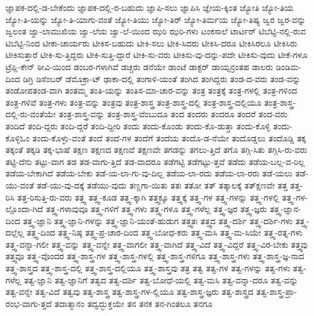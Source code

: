 {ಜ್ಞಾಪಕ-ದಲ್ಲಿ-ಡ-ಬೇಕೆಂದು
ಜ್ಞಾಪಕ-ದಲ್ಲಿ-ರ-ಬಹುದು
ಜ್ಞಾಪಿ-ಸಲು
ಜ್ಞಾಪಿಸಿ
ಜ್ಞೇಯ-ಕ್ಕಿಂತ
ಜ್ಯೋತಿ
ಜ್ಯೋ-ತಿಯ
ಜ್ಯೋ-ತಿ-ಯನ್ನು
ಜ್ಯೋ-ತಿ-ಯಾಗು-ವಂತೆ
ಜ್ಯೋ-ತಿಯು
ಜ್ಯೋ-ತಿರ್
ಜ್ಯೋ-ತಿರ್ಮಯ
ಜ್ಯೋ-ತಿಷ್ಯ
ಜ್ವರ
ಜ್ವರ-ವನ್ನು
ಜ್ವಲಂತ
ಜ್ವಾ-ಲಾಮುಖಿಯ
ಜ್ವಾ-ಲೆಯ
ಜ್ವಾ-ಲೆ-ಯಿಂದ
ಝರಿ
ಝರಿ-ಗಳು
ಟಂಕಸಾಲೆ
ಟಾರ್ಟರ್
ಟಿಬೆಟ್ಟಿ-ನಲ್ಲಿ-ರುವ
ಟಿಬೆಟ್ಟಿ-ನಿಂದ
ಟೀಕಾ-ಚಾರ್ಯರು
ಟೀಕಿಸ-ಬಹುದು
ಟೀಕಿ-ಸಲು
ಟೀಕಿ-ಸಿದರು
ಟೀಕಿಸಿ-ದರೂ
ಟೀಕಿಸಿರಲೂ
ಟೀಕಿಸಿರು
ಟೀಕಿಸುತ್ತಾರೆ
ಟೀಕಿ-ಸು-ತ್ತಿದ್ದರು
ಟೀಕಿ-ಸುತ್ತಿ-ದ್ದಾರೆ
ಟೀಕಿ-ಸು-ವರು
ಟೀಕಿಸು-ವು-ದನ್ನು-ಪದೇ
ಟೀಕಿಸು-ವುದು
ಟೀಕೆ-ಗಳೂ
ಟ್ರೆಪ್ಲಿ-ಕೇನ್
ಠೀವಿ-ಯಿಂದ
ಡಂಬರ-ಗಳಾಗಿವೆ
ಡಚ್ಚರು
ಡನೆಯೇ
ಡಾಂಟೆ
ಡಾಕ್ಟರ್
ಡಾಯ್ಸನ್ರಂತಹ
ಡಾಲರು
ಡಿಂಡಿಮ-ದಿಂದ
ಡಿಗ್ರಿ
ಡಿಸೆಂಬರ್
ಡೆಮೊಕ್ರಾ-ಟ್
ಢಾಕಾ-ದಲ್ಲಿ
ತಂಗಾಳಿ-ಯಂತೆ
ತಂಗಿದ
ತಂಗಿದ್ದರು
ತಂಡ-ದ-ವರು
ತಂಡ-ವನ್ನು
ತಂಡೋಪತಂಡ-ವಾಗಿ
ತಂತಮ್ಮ
ತಂತಿ-ಯನ್ನು
ತಂತಿಸ-ಮಾ-ಚಾರ-ವನ್ನು
ತಂತ್ರ
ತಂತ್ರಕ್ಕೆ
ತಂತ್ರ-ಗಳಲ್ಲಿ
ತಂತ್ರ-ಗಳಿಂದ
ತಂತ್ರ-ಗಳಿವೆ
ತಂತ್ರ-ಗಳು
ತಂತ್ರ-ವನ್ನು
ತಂತ್ರವು
ತಂತ್ರ-ಶಾಸ್ತ್ರ
ತಂತ್ರ-ಶಾಸ್ತ್ರ-ದಲ್ಲಿ
ತಂತ್ರ-ಶಾಸ್ತ್ರ-ದಲ್ಲಿಯೂ
ತಂತ್ರ-ಶಾಸ್ತ್ರ-ದಲ್ಲಿ-ರು-ವಂತೆಯೇ
ತಂತ್ರ-ಶಾಸ್ತ್ರ-ವನ್ನು
ತಂತ್ರ-ಶಾಸ್ತ್ರ-ವೆಂಬುದೂ
ತಂದ
ತಂದರು
ತಂದರೂ
ತಂದರೆ
ತಂದ-ವರು
ತಂದಿದೆ
ತಂದಿ-ದ್ದರು
ತಂದಿ-ದ್ದರೆ
ತಂದಿ-ದ್ದೀರಿ
ತಂದು
ತಂದು-ಕೊಂಡು
ತಂದು-ಕೊ-ಡುತ್ತಾ
ತಂದು-ಕೊಳ್ಳಿ
ತಂದು-ಕೊಳ್ಳಿಓಂ
ತಂದು-ಕೊಳ್ಳು-ವಂತೆ
ತಂದೆ
ತಂದೆ-ಗಳ
ತಂದೆಗೆ
ತಂದೆಯ
ತಂದೊ-ಡ-ನೆಯೇ
ತಂದೊಡ್ಡಲು
ತಂದೊಡ್ಡಿ
ತಕ್ಕ
ತಕ್ಕಂತೆ
ತಕ್ಕಡಿ
ತಕ್ಕ-ಭಾಷೆ
ತಕ್ಷಣ
ತಕ್ಷಣದ
ತಕ್ಷಣವೆ
ತಕ್ಷಣವೇ
ತಗಡನ್ನು
ತಗಲು-ತ್ತಿದೆ
ತಗೊ
ತಗ್ಗಿ-ಸಿತು
ತಗ್ಗಿಸಿ-ರು-ವರು
ತಟ್ಟಿ-ದೆನು
ತಟ್ಟು-ವಾಗ
ತಡ
ತಡ-ವಾಗು-ತ್ತಿದೆ
ತಡ-ವಾದರೂ
ತಡೆಗಟ್ಟಿ
ತಡೆಗಟ್ಟು-ತ್ತವೆ
ತಡೆದು
ತಡೆಯ-ಬಲ್ಲ-ವ-ರಿಲ್ಲ
ತಡೆಯ-ಬೇಕಾಗಿದೆ
ತಡೆಯ-ಬೇಕು
ತಡೆ-ಯ-ಲಾ-ಗು-ವು-ದಿಲ್ಲ
ತಡೆಯ-ಲಾ-ರದು
ತಡೆಯ-ಲಾ-ರರು
ತಡೆ-ಯಲು
ತಡೆ-ಯು-ವಂತೆ
ತಡೆ-ಯು-ವು-ದಕ್ಕೆ
ತಡೆಯು-ವುದು
ತಣ್ಣಗಾ-ಯಿತು
ತತಃ
ತತೋ
ತತ್
ತತ್ಕಾಲಕ್ಕೆ
ತತ್ಕ್ಷಣವೇ
ತತ್ತ
ತತ್ತ-ರಿಸಿ
ತತ್ತ-ರಿಸುತ್ತಿ-ರು-ವರು
ತತ್ತ್ವ
ತತ್ತ್ವ-ಕೂಡ
ತತ್ತ್ವ-ಕ್ಕಾಗಿ
ತತ್ತ್ವಕ್ಕೂ
ತತ್ತ್ವಕ್ಕೆ
ತತ್ತ್ವ-ಗಳ
ತತ್ತ್ವ-ಗಳನ್ನು
ತತ್ತ್ವ-ಗಳಲ್ಲಿ
ತತ್ತ್ವ-ಗಳ-ಲ್ಲೊಂದಾ-ಗಿದೆ
ತತ್ತ್ವ-ಗಳಾವುವೂ
ತತ್ತ್ವ-ಗಳಿಗೆ
ತತ್ತ್ವ-ಗಳು
ತತ್ತ್ವ-ಗಳೂ
ತತ್ತ್ವ-ಗಳೆಲ್ಲ
ತತ್ತ್ವ-ಜ್ಞರ
ತತ್ತ್ವ-ಜ್ಞರು
ತತ್ತ್ವ-ಜ್ಞಾನ-ದಿಂದ
ತತ್ತ್ವ-ಜ್ಞಾನಿ
ತತ್ತ್ವ-ಜ್ಞಾನಿ-ಗಳನ್ನು
ತತ್ತ್ವ-ಜ್ಞಾನಿ-ಯಂತೆ-ಹುಡುಗ
ತತ್ತ್ವತಃ
ತತ್ತ್ವದ
ತತ್ತ್ವ-ದರ್ಶಿ
ತತ್ತ್ವ-ದರ್ಶಿ-ಗಳು
ತತ್ತ್ವ-ದಲ್ಲೆಲ್ಲ
ತತ್ತ್ವ-ದಿಂದ
ತತ್ತ್ವ-ನಿಷ್ಠ
ತತ್ತ್ವ-ಪ್ರ-ಚಾರ-ದಿಂದ
ತತ್ತ್ವ-ಬೋಧ-ಕರು
ತತ್ತ್ವ-ಮಸಿ
ತತ್ತ್ವ-ಮ-ಸಿಯೇ
ತತ್ತ್ವ-ರತ್ನ-ಗಳು
ತತ್ತ್ವ-ವನ್ನಾ-ಗಲೀ
ತತ್ತ್ವ-ವನ್ನು
ತತ್ತ್ವ-ವನ್ನೇ
ತತ್ತ್ವ-ವಾಗಲೀ
ತತ್ತ್ವ-ವಾಗಿದೆ
ತತ್ತ್ವ-ವಿದೆ
ತತ್ತ್ವ-ವಿದ್ದರೆ
ತತ್ತ್ವ-ವಿರ-ಬೇಕು
ತತ್ತ್ವವು
ತತ್ತ್ವವೂ
ತತ್ತ್ವ-ವೊಂದರ
ತತ್ತ್ವ-ಶಾಸ್ತ್ರ-ಗಳ
ತತ್ತ್ವ-ಶಾಸ್ತ್ರ-ಗಳಲ್ಲಿ
ತತ್ತ್ವ-ಶಾಸ್ತ್ರ-ಗಳಿಗೂ
ತತ್ತ್ವ-ಶಾಸ್ತ್ರ-ಗಳು
ತತ್ತ್ವ-ಶಾಸ್ತ್ರ-ಜ್ಞ-ನಾದ
ತತ್ತ್ವ-ಶಾಸ್ತ್ರದ
ತತ್ತ್ವ-ಶಾಸ್ತ್ರ-ದಲ್ಲಿ
ತತ್ತ್ವ-ಶಾಸ್ತ್ರ-ದಲ್ಲಿಯೂ
ತತ್ತ್ವ-ಶಾಸ್ತ್ರವು
ತತ್ರ
ತತ್ವ
ತತ್ವ-ಗಳ
ತತ್ವ-ಗಳನ್ನು
ತತ್ವ-ಗಳು
ತತ್ವ-ಗಳೆಲ್ಲ
ತತ್ವ-ಜ್ಞಾನಿ
ತತ್ವ-ಜ್ಞಾನಿಗೆ
ತತ್ವದ
ತತ್ವ-ದರ್ಶಿ
ತತ್ವ-ಬೋಧೆ-ಯಲ್ಲಿ
ತತ್ವ-ಮಸಿ
ತತ್ವ-ವನ್ನಾ-ದರೂ
ತತ್ವ-ವನ್ನು
ತತ್ವ-ವನ್ನೇ
ತತ್ವ-ವಿದೆ
ತತ್ವವು
ತತ್ವ-ಶಾಸ್ತ್ರ
ತತ್ವ-ಶಾಸ್ತ್ರ-ಗಳ-ಲ್ಲಿಯೂ
ತತ್ವ-ಶಾಸ್ತ್ರ-ಜ್ಞರು
ತತ್ವ-ಶಾಸ್ತ್ರದ
ತತ್ವ-ಶಾಸ್ತ್ರ-ಪ್ರಾ-ರಂಭ-ವಾಗು-ತ್ತದೆ
ತದಾತ್ಮಾನಂ
ತದ್ವದ್ಭುಕ್ತಯೇ
ತನ
ತನಕ
ತನ-ಗಿಂತಲೂ
ತನಗೂ
}
